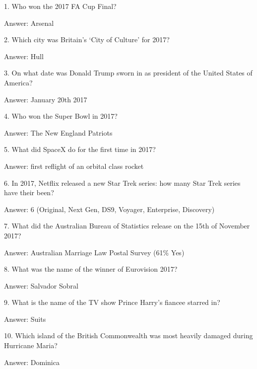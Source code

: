 \documentclass{beamer}
\begin{document}
    \begin{frame}
        1. Who won the 2017 FA Cup Final? 

        Answer: Arsenal
    \end{frame}

    \begin{frame}
        2. Which city was Britain's `City of Culture' for 2017?

        Answer: Hull
    \end{frame}

    \begin{frame}
        3. On what date was Donald Trump sworn in as president of the United
        States of America?

        Answer: January 20th 2017
    \end{frame}

    \begin{frame}
        4. Who won the Super Bowl in 2017?

        Answer: The New England Patriots
    \end{frame}

    \begin{frame}
        5. What did SpaceX do for the first time in 2017?

        Answer: first reflight of an orbital class rocket
    \end{frame}

    \begin{frame}
        6. In 2017, Netflix released a new Star Trek series: how many Star Trek
        series have their been?

        Answer: 6 (Original, Next Gen, DS9, Voyager, Enterprise, Discovery)
    \end{frame}

    \begin{frame}
        7. What did the Australian Bureau of Statistics release on the 15th of
        November 2017?

        Answer: Australian Marriage Law Postal Survey (61\% Yes)
    \end{frame}

    \begin{frame}
        8. What was the name of the winner of Eurovision 2017?

        Answer: Salvador Sobral
    \end{frame}

    \begin{frame}
        9. What is the name of the TV show Prince Harry's fiancee starred in?

        Answer: Suits
    \end{frame}

    \begin{frame}
        10. Which island of the British Commonwealth was most heavily damaged
        during Hurricane Maria?

        Answer: Dominica
    \end{frame}
\end{document}
